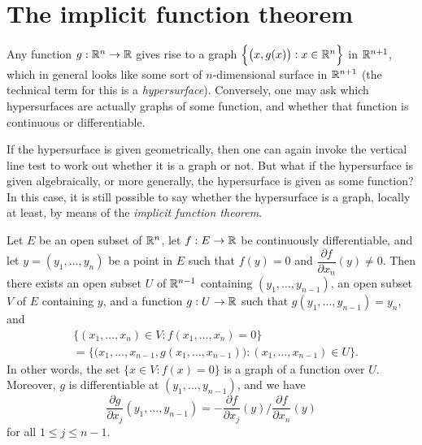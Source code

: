 \section{The implicit function theorem}\label{sec:6.8}

\begin{note}
  Any function \(g : \mathbb{R}^n \to \mathbb{R}\) gives rise to a graph \(\Big\{\big(x, g(x)\big) : x \in \mathbb{R}^n\Big\}\) in \(\mathbb{R}^{n + 1}\), which in general looks like some sort of \(n\)-dimensional surface in \(\mathbb{R}^{n + 1}\)
  (the technical term for this is a \emph{hypersurface}).
  Conversely, one may ask which hypersurfaces are actually graphs of some function, and whether that function is continuous or differentiable.
\end{note}

\begin{note}
  If the hypersurface is given geometrically, then one can again invoke the vertical line test to work out whether it is a graph or not.
  But what if the hypersurface is given algebraically, or more generally, the hypersurface is given as some function?
  In this case, it is still possible to say whether the hypersurface is a graph, locally at least, by means of the \emph{implicit function theorem}.
\end{note}

\begin{thm}\label{6.8.1}
  Let \(E\) be an open subset of \(\mathbb{R}^n\), let \(f : E \to \mathbb{R}\) be continuously differentiable, and let \(y = (y_1, \dots, y_n)\) be a point in \(E\) such that \(f(y) = 0\) and \(\dfrac{\partial f}{\partial x_n}(y) \neq 0\).
  Then there exists an open subset \(U\) of \(\mathbb{R}^{n - 1}\) containing \((y_1, \dots, y_{n - 1})\), an open subset \(V\) of \(E\) containing \(y\), and a function \(g : U \to \mathbb{R}\) such that \(g(y_1, \dots, y_{n - 1}) = y_n\), and
  \begin{align*}
     & \{(x_1, \dots, x_n) \in V : f(x_1, \dots, x_n) = 0\}                                                     \\
     & = \Big\{\big(x_1, \dots, x_{n - 1}, g(x_1, \dots, x_{n - 1})\big) : (x_1, \dots, x_{n - 1}) \in U\Big\}.
  \end{align*}
  In other words, the set \(\{x \in V : f(x) = 0\}\) is a graph of a function over \(U\).
  Moreover, \(g\) is differentiable at \((y_1, \dots, y_{n - 1})\), and we have
  \[
    \dfrac{\partial g}{\partial x_j}(y_1, \dots, y_{n - 1}) = -\dfrac{\partial f}{\partial x_j}(y) / \dfrac{\partial f}{\partial x_n}(y) \tag{6.1}\label{eq 6.1}
  \]
  for all \(1 \leq j \leq n - 1\).
\end{thm}

